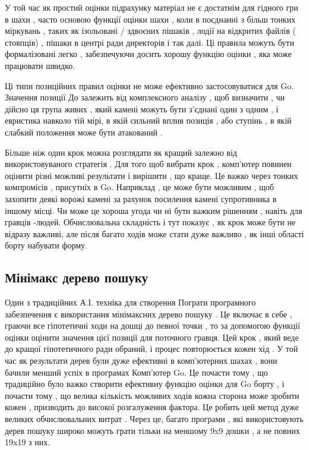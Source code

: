 У той час як простий оцінки підрахунку матеріал не є достатнім для гідного гри в шахи , часто основою функції оцінки шахи , коли в поєднанні з більш тонких міркувань , таких як ізольовані / здвоєних пішаків , лодії на відкритих файлів ( стовпців) , пішаки в центрі ради директорів і так далі. Ці правила можуть бути формалізовані легко , забезпечуючи досить хорошу функцію оцінки , яка може працювати швидко.

Ці типи позиційних правил оцінки не може ефективно застосовуватися для Go. Значення позиції До залежить від комплексного аналізу , щоб визначити , чи дійсно ця група живих , який камені можуть бути з'єднані один з одним , і евристика навколо тій мірі, в якій сильний вплив позиція , або ступінь , в якій слабкий положення може бути атакований .

Більше ніж один крок можна розглядати як кращий залежно від використовуваного стратегія . Для того щоб вибрати крок , комп'ютер повинен оцінити різні можливі результати і вирішити , що краще. Це важко через тонких компромісів , присутніх в Go. Наприклад , це може бути можливим , щоб захопити деякі ворожі камені за рахунок посилення камені супротивника в іншому місці. Чи може це хороша угода чи ні бути важким рішенням , навіть для гравців -людей. Обчислювальна складність і тут показує , як крок може бути не відразу важливі, але після багато ходів може стати дуже важливо , як інші області борту набувати форму.


\subsection{Мінімакс дерево пошуку}
Один з традиційних А.І. техніка для створення Пограти програмного забезпечення є використання мінімаксних дерево пошуку . Це включає в себе , граючи все гіпотетичні ходи на дошці до певної точки , то за допомогою функції оцінки оцінити значення цієї позиції для поточного гравця. Цей крок , який веде до кращої гіпотетичного ради обраний, і процес повторюється кожен хід . У той час як результати дерев були дуже ефективні в комп'ютерних шахах , вони бачили менший успіх в програмах Комп'ютер Go. Це почасти тому , що традиційно було важко створити ефективну функцію оцінки для Go борту , і почасти тому , що велика кількість можливих ходів кожна сторона може зробити кожен , призводить до високої розгалуження фактора. Це робить цей метод дуже великих обчислювальних витрат . Через це, багато програми , які використовують дерев пошуку широко можуть грати тільки на меншому 9x9 дошки , а не повних 19x19 з них.

